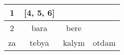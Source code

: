 \begin{tabular}{ |c|c|c|c| }  
 	 \hline 
 	 1 & [4, 5, 6] &  &  \\ \hline
	 2 & bara & bere &  \\ \hline
	 za & tebya & kalym & otdam \\ \hline 
\end{tabular}